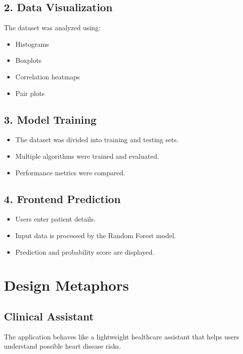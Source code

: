 \documentclass[12pt]{article}
\begin{document}
\subsection*{2. Data Visualization}

The dataset was analyzed using:
\begin{itemize}
    \item Histograms
    \item Boxplots
    \item Correlation heatmaps
    \item Pair plots
\end{itemize}

\subsection*{3. Model Training}

\begin{itemize}
    \item The dataset was divided into training and testing sets.
    \item Multiple algorithms were trained and evaluated.
    \item Performance metrics were compared.
\end{itemize}

\subsection*{4. Frontend Prediction}

\begin{itemize}
    \item Users enter patient details.
    \item Input data is processed by the Random Forest model.
    \item Prediction and probability score are displayed.
\end{itemize}

\section*{Design Metaphors}

\subsection*{Clinical Assistant}

The application behaves like a lightweight healthcare assistant that helps users understand possible heart disease risks.
\end{document}
